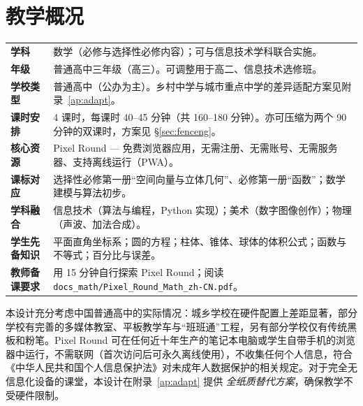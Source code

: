 \documentclass[12pt,a4paper]{scrartcl}
\begin{document}
\renewcommand{\contentsname}{\color{accent}目\quad 录}
\tableofcontents
\thispagestyle{fancy}
\newpage

\section{教学概况}

\begin{center}
\begin{tabular}{@{}p{}p{}@{}}
\toprule
\textbf{学科} & 数学（必修与选择性必修内容）；可与信息技术学科联合实施。 \\
\addlinespace[2pt]
\textbf{年级} & 普通高中三年级（高三）。可调整用于高二、信息技术选修班。 \\
\addlinespace[2pt]
\textbf{学校类型} & 普通高中（公办为主）。乡村中学与城市重点中学的差异适配方案见附录~\ref{ap:adapt}。 \\
\addlinespace[2pt]
\textbf{课时安排} & 4 课时，每课时 40--45 分钟（共 160--180 分钟）。亦可压缩为两个 90 分钟的双课时，方案见 §\ref{sec:fenceng}。 \\
\addlinespace[2pt]
\textbf{核心资源} & Pixel Round --- 免费浏览器应用，无需注册、无需账号、无需服务器、支持离线运行（PWA）。 \\
\addlinespace[2pt]
\textbf{课标对应} & 选择性必修第一册“空间向量与立体几何”、必修第一册“函数”；数学建模与算法初步。 \\
\addlinespace[2pt]
\textbf{学科融合} & 信息技术（算法与编程，Python 实现）；美术（数字图像创作）；物理（声波、加法合成）。 \\
\addlinespace[2pt]
\textbf{学生先备知识} & 平面直角坐标系；圆的方程；柱体、锥体、球体的体积公式；函数与不等式；百分比与误差。 \\
\addlinespace[2pt]
\textbf{教师备课要求} & 用 15 分钟自行探索 Pixel Round；阅读 \texttt{docs\_math/Pixel\_Round\_Math\_zh-CN.pdf}。 \\
\bottomrule
\end{tabular}
\end{center}

\begin{shuoming}[关于实施环境的说明]
本设计充分考虑中国普通高中的实际情况：城乡学校在硬件配置上差距显著，部分学校有完善的多媒体教室、平板教学车与“班班通”工程，另有部分学校仅有传统黑板和粉笔。Pixel Round 可在任何近十年生产的笔记本电脑或学生自带手机的浏览器中运行，不需联网（首次访问后可永久离线使用），不收集任何个人信息，符合《中华人民共和国个人信息保护法》对未成年人数据保护的相关规定。对于完全无信息化设备的课堂，本设计在附录~\ref{ap:adapt} 提供 \emph{全纸质替代方案}，确保教学不受硬件限制。
\end{shuoming}
\end{document}
